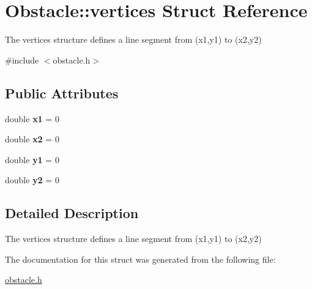 \hypertarget{struct_obstacle_1_1vertices}{\section{Obstacle\-:\-:vertices Struct Reference}
\label{struct_obstacle_1_1vertices}
}


The vertices structure defines a line segment from (x1,y1) to (x2,y2)  




{\ttfamily \#include $<$obstacle.\-h$>$}

\subsection*{Public Attributes}
\begin{DoxyCompactItemize}
\item 
\hypertarget{struct_obstacle_1_1vertices_a206f9ddf5ee862aa3f94a467a5130fe8}{double {\bfseries x1} = 0}\label{struct_obstacle_1_1vertices_a206f9ddf5ee862aa3f94a467a5130fe8}

\item 
\hypertarget{struct_obstacle_1_1vertices_a288f481be9487ef2e9bd29234434898a}{double {\bfseries x2} = 0}\label{struct_obstacle_1_1vertices_a288f481be9487ef2e9bd29234434898a}

\item 
\hypertarget{struct_obstacle_1_1vertices_a6e8b0bae030a86f396ed817dae13e675}{double {\bfseries y1} = 0}\label{struct_obstacle_1_1vertices_a6e8b0bae030a86f396ed817dae13e675}

\item 
\hypertarget{struct_obstacle_1_1vertices_ab8c0c5470f1a46fcafd899b1aab82b2a}{double {\bfseries y2} = 0}\label{struct_obstacle_1_1vertices_ab8c0c5470f1a46fcafd899b1aab82b2a}

\end{DoxyCompactItemize}


\subsection{Detailed Description}
The vertices structure defines a line segment from (x1,y1) to (x2,y2) 

The documentation for this struct was generated from the following file\-:\begin{DoxyCompactItemize}
\item 
\hyperlink{obstacle_8h}{obstacle.\-h}\end{DoxyCompactItemize}
